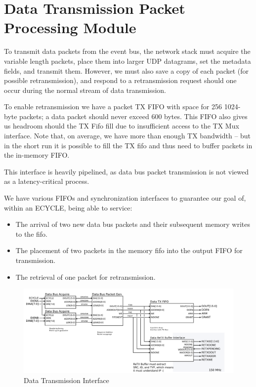 \section{Data Transmission Packet Processing Module}

To transmit data packets from the event bus, the network stack must
acquire the variable length packets, place them into larger UDP
datagrams, set the metadata fields, and transmit them. However, we
must also save a copy of each packet (for possible retransmission),
and respond to a retransmission request should one occur during the
normal stream of data transmission.

To enable retransmission we have a packet TX FIFO with space for 256
1024-byte packets; a data packet should never exceed 600 bytes. This
FIFO also gives us headroom should the TX Fifo fill due to
insufficient access to the TX Mux interface. Note that, on average, we
have more than enough TX bandwidth -- but in the short run it is
possible to fill the TX fifo and thus need to buffer packets in the
in-memory FIFO.

This interface is heavily pipelined, as data bus packet transmission
is not viewed as a latency-critical process.

We have various FIFOs and synchronization interfaces to guarantee our
goal of, within an ECYCLE, being able to service:

\begin{itemize}
\item The arrival of two new data bus packets and their subsequent
  memory writes to the fifo.
\item The placement of two packets in the memory fifo into the output
  FIFO for transmission. 
\item The retrieval of one packet for retransmission. 
\end{itemize}

 \begin{figure}
\begin{centering}
\includegraphics[scale=0.7]{data.svg}
\end{centering}
\caption{Data Transmission Interface}
\label{data}
\end{figure}

